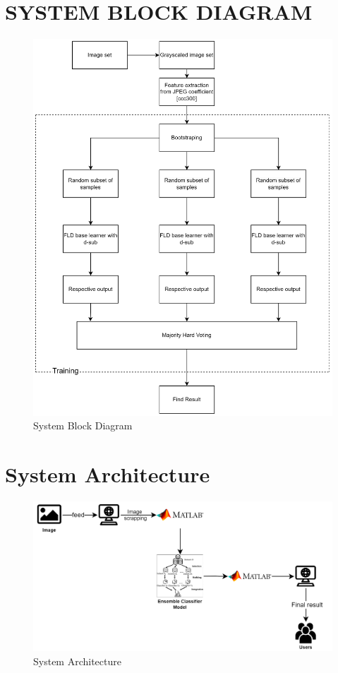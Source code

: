 \section{SYSTEM BLOCK DIAGRAM}
\begin{figure}[H]
    \centering
    \includegraphics[width=160mm]{./img/blockDiagram.png}
    \caption{System Block Diagram}
\end{figure}
\section{System Architecture}
\begin{figure}[H]
    \includegraphics[width=160mm]{./img/architecture.png}
    \caption{System Architecture}
\end{figure}